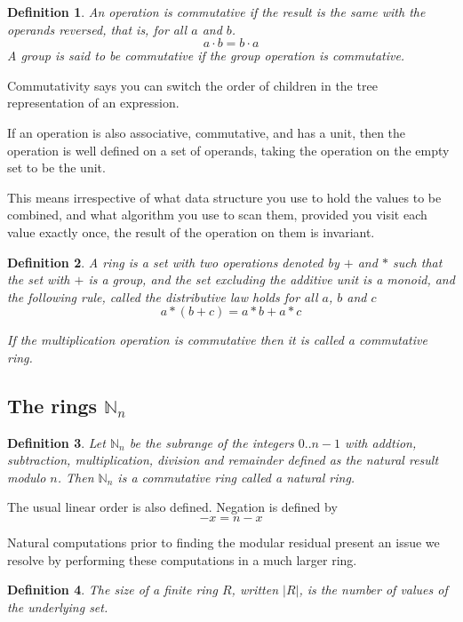 \documentclass{article}
\newtheorem{definition}{Definition}
\begin{document}
\begin{definition}
An operation is {\em commutative} if the result is the same with the operands
reversed, that is, for all $a$ and $b$.
$$a \cdot b = b \cdot a$$
A group is said to be commutative if the group operation is commutative.
\end{definition}

Commutativity says you can switch the order of children in the tree representation
of an expression.

If an operation is also associative, commutative, and has a unit, then the operation
is well defined on a set of operands, taking the operation on the empty
set to be the unit. 

This means irrespective of what data structure you use to hold the
values to be combined, and what algorithm you use to scan them,
provided you visit each value exactly once, the result of the
operation on them is invariant.

\begin{definition}
A {\em ring} is a set with two operations denoted by $+$ and $*$ such
that the set with $+$ is a group, and the set excluding the additive
unit is a monoid, and the following rule, called the
{\em distributive law} holds for all $a$, $b$ and $c$
$$a * (b + c)  = a * b + a * c$$

If the multiplication operation is commutative then it is called
a commutative ring.
\end{definition}

\subsection{The rings $\mathbb{N}_n$}
\begin{definition}
Let $\mathbb{N}_n$ be the subrange of the integers $0..n-1$ with 
addtion, subtraction, 
multiplication, division and remainder defined as the natural result modulo $n$.
Then $\mathbb{N}_n$ is a commutative ring called a {\em natural ring}.
\end{definition}

The usual linear order is also defined.  Negation is defined by
$$-x = n - x$$

Natural computations prior to finding the modular residual present an issue
we resolve by performing these computations in a much larger ring.

\begin{definition}
The {\em size} of a finite ring $R$, written $|R|$, is the number of values of the underlying set.
\end{definition}
\end{document}
